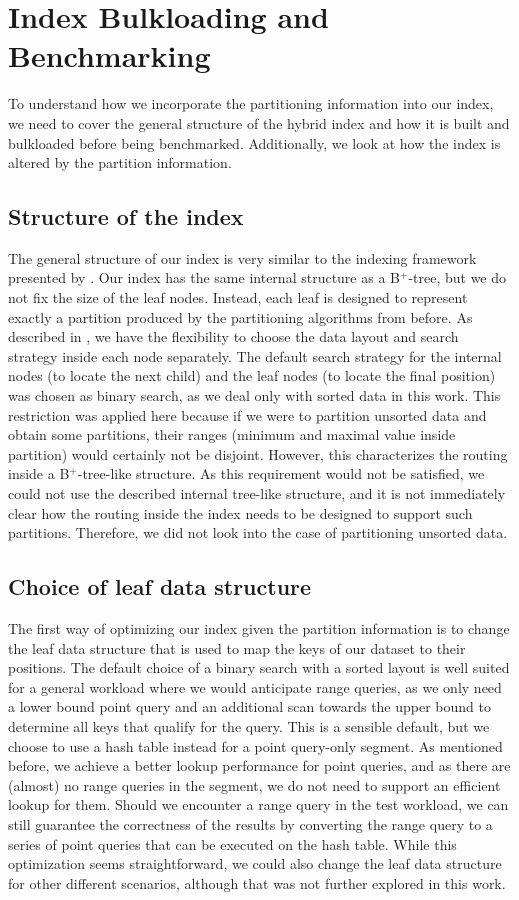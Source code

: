 \section{Index Bulkloading and Benchmarking}
To understand how we incorporate the partitioning information into our index, we need to cover the general structure of the hybrid index and how it is built and bulkloaded before being benchmarked. Additionally, we look at how the index is altered by the partition information.

\subsection{Structure of the index}
The general structure of our index is very similar to the indexing framework presented by \citeauthor{Dittrich2021} \cite{Dittrich2021}. Our index has the same internal structure as a B$^+$-tree, but we do not fix the size of the leaf nodes. Instead, each leaf is designed to represent exactly a partition produced by the partitioning algorithms from before. As described in , we have the flexibility to choose the data layout and search strategy inside each node separately. The default search strategy for the internal nodes (to locate the next child) and the leaf nodes (to locate the final position) was chosen as binary search, as we deal only with sorted data in this work. This restriction was applied here because if we were to partition unsorted data and obtain some partitions, their ranges (minimum and maximal value inside partition) would certainly not be disjoint. However, this characterizes the routing inside a B$^+$-tree-like structure. As this requirement would not be satisfied, we could not use the described internal tree-like structure, and it is not immediately clear how the routing inside the index needs to be designed to support such partitions. Therefore, we did not look into the case of partitioning unsorted data.

\subsection{Choice of leaf data structure}
The first way of optimizing our index given the partition information is to change the leaf data structure that is used to map the keys of our dataset to their positions. The default choice of a binary search with a sorted layout is well suited for a general workload where we would anticipate range queries, as we only need a lower bound point query and an additional scan towards the upper bound to determine all keys that qualify for the query. This is a sensible default, but we choose to use a hash table instead for a point query-only segment. As mentioned before, we achieve a better lookup performance for point queries, and as there are (almost) no range queries in the segment, we do not need to support an efficient lookup for them. Should we encounter a range query in the test workload, we can still guarantee the correctness of the results by converting the range query to a series of point queries that can be executed on the hash table. While this optimization seems straightforward, we could also change the leaf data structure for other different scenarios, although that was not further explored in this work.

